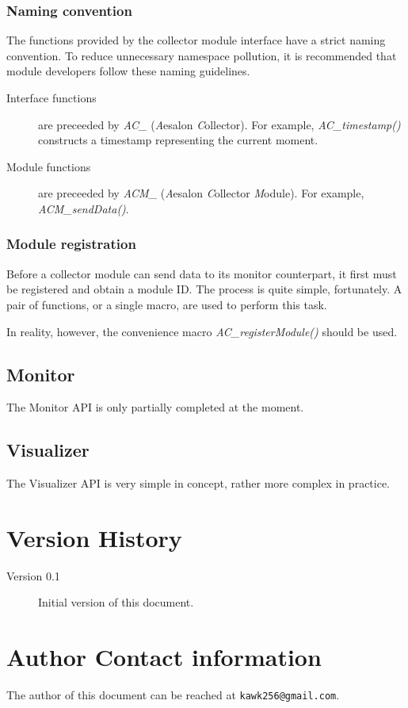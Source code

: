 \documentclass[a4paper,10pt]{report}
\begin{document}
\subsection{Naming convention}
The functions provided by the collector module interface have a strict naming convention. To reduce unnecessary namespace
pollution, it is recommended that module developers follow these naming guidelines.
\begin{description}
 \item[Interface functions] are preceeded by \emph{AC\_} (\emph{A}esalon \emph{C}ollector). For example, \emph{AC\_timestamp()}
constructs a timestamp representing the current moment.
 \item[Module functions] are preceeded by \emph{ACM\_} (\emph{A}esalon \emph{C}ollector \emph{M}odule). For example,
\emph{ACM\_sendData()}.
\end{description}

\subsection{Module registration}
Before a collector module can send data to its monitor counterpart, it first must be registered and obtain a module ID.
The process is quite simple, fortunately. A pair of functions, or a single macro, are used to perform this task.



In reality, however, the convenience macro \emph{AC\_registerModule()} should be used.




\section{Monitor}
The Monitor API is only partially completed at the moment.
\section{Visualizer}
The Visualizer API is very simple in concept, rather more complex in practice.

\appendix

\chapter{Version History}
\begin{description}
 \item[Version 0.1] Initial version of this document.
\end{description}

\chapter{Author Contact information}
The author of this document can be reached at \texttt{kawk256@gmail.com}.
\end{document}
